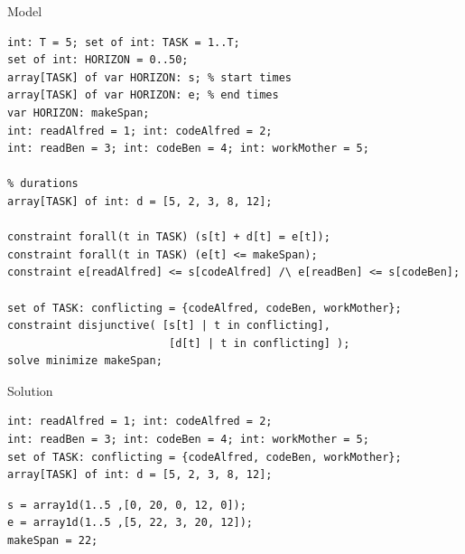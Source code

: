 \begin{frame}[fragile]{Model}

\begin{lstlisting}
int: T = 5; set of int: TASK = 1..T;
set of int: HORIZON = 0..50;
array[TASK] of var HORIZON: s; % start times
array[TASK] of var HORIZON: e; % end times 
var HORIZON: makeSpan; 
int: readAlfred = 1; int: codeAlfred = 2;
int: readBen = 3; int: codeBen = 4; int: workMother = 5;

% durations
array[TASK] of int: d = [5, 2, 3, 8, 12];

constraint forall(t in TASK) (s[t] + d[t] = e[t]);
constraint forall(t in TASK) (e[t] <= makeSpan);
constraint e[readAlfred] <= s[codeAlfred] /\ e[readBen] <= s[codeBen];

set of TASK: conflicting = {codeAlfred, codeBen, workMother};
constraint disjunctive( [s[t] | t in conflicting], 
                         [d[t] | t in conflicting] ); 
solve minimize makeSpan;
\end{lstlisting}
\end{frame}

\begin{frame}[fragile]{Solution}

\begin{lstlisting}
int: readAlfred = 1; int: codeAlfred = 2;
int: readBen = 3; int: codeBen = 4; int: workMother = 5;
set of TASK: conflicting = {codeAlfred, codeBen, workMother};
array[TASK] of int: d = [5, 2, 3, 8, 12];
\end{lstlisting}
\small 
\begin{verbatim}
s = array1d(1..5 ,[0, 20, 0, 12, 0]);
e = array1d(1..5 ,[5, 22, 3, 20, 12]);
makeSpan = 22;
\end{verbatim}

 \hspace*{-2ex}
 
\end{frame}

